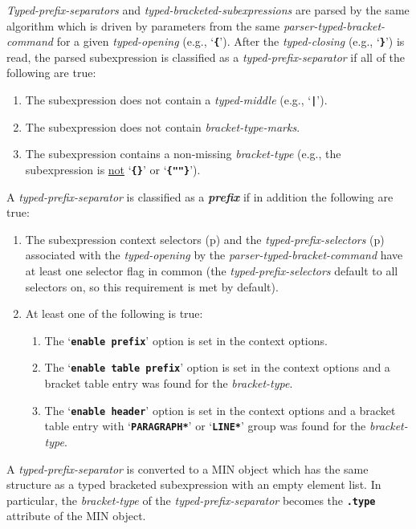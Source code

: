 \documentclass[12pt]{article}
\newcommand{\TT}[1]{{\tt \bfseries #1}}
\newcommand{\key}[1]{{\bf \em #1}\index{#1}}
\newcommand{\pagref}[1]{p\pageref{#1}}
\begin{document}
{\em Typed-prefix-separators} and {\em typed-bracketed-subexpressions}
are parsed by the same algorithm which is driven by parameters from
the same {\em parser-typed-bracket-command} for a given {\em typed-opening}
(e.g., `\TT{\{}').
After the {\em typed-closing}
(e.g., `\TT{\}}') is read, the parsed subexpression is classified as
a {\em typed-prefix-separator} if all of the following are true:
\begin{enumerate}
\item The subexpression does not contain a {\em typed-middle} (e.g., `\TT{|}'). 
\item The subexpression does not contain {\em bracket-type-marks}.
\item The subexpression contains a non-missing
      {\em bracket-type} (e.g., the subexpression is \underline{not}
      `\TT{\{\}}' or `\TT{\{""\}}').
\setcounter{PREFIX-COUNTER}{\value{enumi}}
\end{enumerate}
A {\em typed-prefix-separator} is classified as a \key{prefix}\label{PREFIX}
if in addition the following are true:
\begin{enumerate}
\setcounter{enumi}{\value{PREFIX-COUNTER}}
\item\label{TYPED-PREFIX-SELECTORS-USE}
The subexpression context selectors (\pagref{CONTEXT-SELECTORS})
and the {\em typed-prefix-selectors} (\pagref{TYPED-PREFIX-SELECTORS})
associated with the {\em typed-opening} by the
{\em parser-typed-bracket-command} have at least one selector flag in
common (the {\em typed-prefix-selectors} default to all selectors on,
so this requirement is met by default).
\item At least one of the following is true:
\begin{enumerate}
\item The `\TT{enable prefix}' option is set in the context options.
\item The `\TT{enable table prefix}' option is set in the context options
      and a bracket table entry was found for the {\em bracket-type}.
\item The `\TT{enable header}' option is set in the context options
      and a bracket table entry with `\TT{*PARAGRAPH*}' or `\TT{*LINE*}'
      group was found for the {\em bracket-type}.
\end{enumerate}
\end{enumerate}

A {\em typed-prefix-separator} is converted to a MIN object which has the
same structure as a typed bracketed subexpression with an empty element list.
In particular, the {\em bracket-type} of the {\em typed-prefix-separator}
becomes the \TT{.type} attribute of the MIN object.
\end{document}
